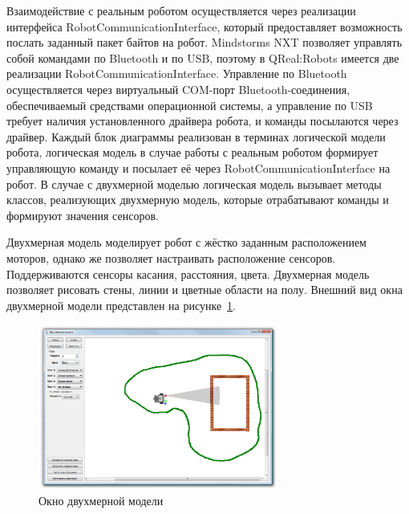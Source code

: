 \documentclass[a4paper]{article}
\begin{document}
Взаимодействие с реальным роботом осуществляется через реализации интерфейса RobotCommunicationInterface, который предоставляет возможность послать заданный пакет байтов на робот. Mindstorms NXT позволяет управлять собой командами по Bluetooth и по USB, поэтому в QReal:Robots имеется две реализации RobotCommunicationInterface. Управление по Bluetooth осуществляется через виртуальный COM-порт Bluetooth-соединения, обеспечиваемый средствами операционной системы, а управление по USB требует наличия установленного драйвера робота, и команды посылаются через драйвер. Каждый блок диаграммы реализован в терминах логической модели робота, логическая модель в случае работы с реальным роботом формирует управляющую команду и посылает её через RobotCommunicationInterface на робот. В случае с двухмерной моделью логическая модель вызывает методы классов, реализующих двухмерную модель, которые отрабатывают команды и формируют значения сенсоров.

Двухмерная модель моделирует робот с жёстко заданным расположением моторов, однако же позволяет настраивать расположение сенсоров. Поддерживаются сенсоры касания, расстояния, цвета. Двухмерная модель позволяет рисовать стены, линии и цветные области на полу. Внешний вид окна двухмерной модели представлен на рисунке~\ref{2dModel}.

\begin{figure} [ht]
  \begin{center}
    \includegraphics[width=0.7\textwidth]{2dModel.png}
    \caption{Окно двухмерной модели}
    \label{2dModel}
  \end{center}
\end{figure}
\end{document}
